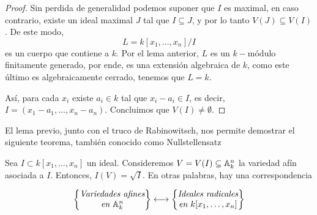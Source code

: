 \documentclass[11pt]{article}
\begin{document}
\begin{proof}
    Sin perdida de generalidad podemos suponer que $I$ es maximal, en caso contrario, existe un
    ideal maximal $J$ tal que $I\subseteq J$, y por lo tanto $V(J)\subseteq V(I)$. De este modo,
    \begin{equation*}
        L=k[x_{1},\dots,x_{n}]/I
    \end{equation*}
    es un cuerpo que contiene a $k$. Por el lema anterior, $L$ es un $k-$módulo finitamente 
    generado, por ende, es una extensión algebraica de $k$, como este último es algebraicamente
    cerrado, tenemos que $L=k$.

    Así, para cada $x_{i}$ existe $a_{i}\in k$ tal que $x_{i}-a_{i}\in I$, es decir, 
    $I=(x_{1}-a_{1},\dots,x_{n}-a_{n})$. Concluimos que $V(I)\neq\emptyset$.
\end{proof}

\noindent El lema previo, junto con el truco de Rabinowitsch, nos permite demostrar el siguiente
teorema, también conocido como Nullstellensatz

\begin{teo}
    Sea $I\subset k[x_{1},\dots,x_{n}]$ un ideal. Consideremos $V=V(I)\subseteq\mathbb{A}_{k}^{n}$ la
    variedad afín asociada a $I$. Entonces, $I(V)=\sqrt{I}$. En otras palabras, hay una
    correspondencia
    
    \begin{equation*}
        \begin{Bmatrix}
            \textit{Variedades afines} \\
            \textit{en }\mathbb{A}_{k}^{n}
        \end{Bmatrix}
        \longleftrightarrow
        \begin{Bmatrix}
            \textit{Ideales radicales} \\
            \textit{en }k[x_{1},\dots,x_{n}]
        \end{Bmatrix}
    \end{equation*}
\end{teo}
\end{document}
